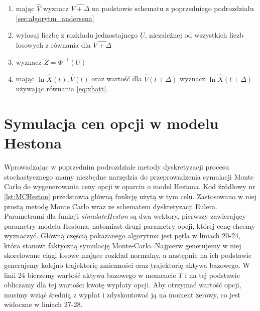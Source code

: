 \documentclass{pracamgr}
\begin{document}
\begin{enumerate}
  \item mając $\hat{V}$ wyznacz $\hat{V + \Delta}$ na podstawie schematu z poprzedniego podrozdziału \ref{sec:algorytm_andersena}
  \item wylosuj liczbę z rozkładu jednostajnego $U$, niezależnej od wszystkich liczb losowych z równania dla $\hat{V + \Delta}$
  \item wyznacz $Z = \Phi^{-1}(U)$
  \item mając $\ln \hat{X}(t), \hat{V}(t)$ oraz wartość dla $\hat{V}(t + \Delta)$ wyznacz $\ln \hat{X} (t+\Delta)$ używając równania \ref{eq:xhatt}.
\end{enumerate}





\section{Symulacja cen opcji w modelu Hestona}

Wprowadzając w poprzednim podrozdziale metody dyskretyzacji procesu stochastycznego mamy niezbędne narzędzia
do przeprowadzenia symulacji Monte Carlo do wygenerowania ceny opcji w oparciu o model Hestona.
Kod źródłowy nr \ref{lst:MCHeston} przedstawia główną funkcję użytą w tym celu. 
Zastosowano w niej prostą metodę Monte Carlo wraz ze schematem dyskretyzacji Eulera. 
Parametrami dla funkcji \textit{simulateHeston} są dwa wektory, pierwszy zawierający
parametry modelu Hestona, natomiast drugi parametry opcji, której cenę chcemy wyznaczyć. 
Główną częścią pokazanego algorytmu jest pętla w liniach 20-24, która stanowi faktyczną symulację
Monte-Carlo. Najpierw generujemy w niej skorelowane ciągi losowe mające rozkład normalny, a następnie na ich
podstawie generujemy kolejno trajektorię zmienności oraz trajektorię aktywa bazowego. W linii 24 bierzemy 
wartość aktywa bazowego w momencie $T$ i na tej podstawie obliczamy dla tej wartości kwotę wypłaty opcji. 
Aby otrzymać wartość opcji, musimy wziąć średnią z wypłat i zdyskontować ją na moment zerowy, co jest 
widoczne w liniach 27-28.


\end{document}
